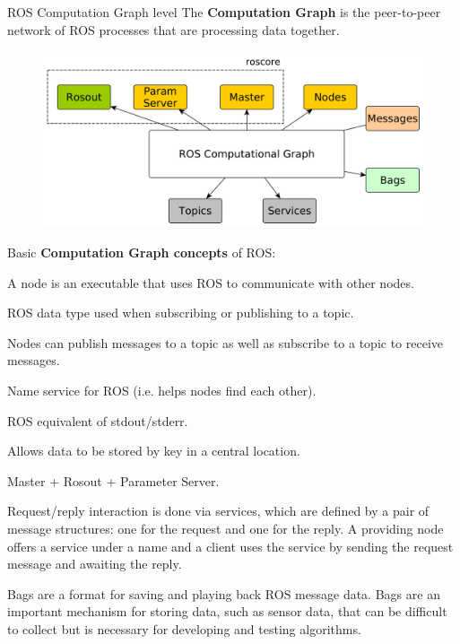 \begin{frame}[allowframebreaks]{ROS Computation Graph level}
The \textbf{Computation Graph} is the peer-to-peer network of ROS processes that are processing data together. 

 \begin{figure}
	\includegraphics[width=.6\textwidth]{./img/ros/RosGraph.pdf}
 \end{figure}
 
Basic \textbf{Computation Graph concepts} of ROS:

 \begin{description}[leftmargin=10.1cm]
  \item[Nodes] A node is an executable that uses ROS to communicate with other nodes.
  \item[Messages] ROS data type used when subscribing or publishing to a topic.
  \item[Topics] Nodes can publish messages to a topic as well as subscribe to a topic to receive messages.
  \item[Master] Name service for ROS (i.e. helps nodes find each other).
  \item[rosout] ROS equivalent of stdout/stderr.
  \item[Parameter Server] Allows data to be stored by key in a central location.
  \item[roscore] Master + Rosout + Parameter Server.
  \item[Services] Request/reply interaction is done via services, which are defined by a pair of message structures: one for the request and one for the reply. A providing node offers a service under a name and a client uses the service by sending the request message and awaiting the reply.
  \item[Bags] Bags are a format for saving and playing back ROS message data. Bags are an important mechanism for storing data, such as sensor data, that can be difficult to collect but is necessary for developing and testing algorithms.
 \end{description}
 
\end{frame}

